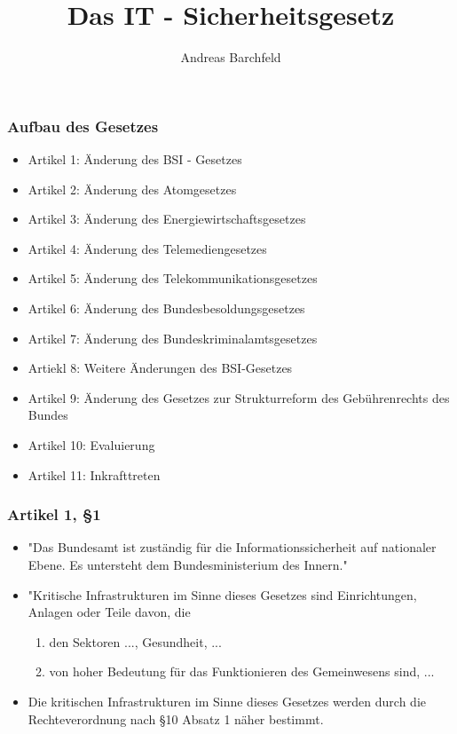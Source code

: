 \documentclass[11pt]{beamer}
\author{Andreas Barchfeld}
\title{Das IT - Sicherheitsgesetz}
\begin{document}
	\maketitle
	
	\begin{frame}
		\frametitle{Aufbau des Gesetzes}
		\begin{itemize} %
		\item Artikel 1: Änderung des BSI - Gesetzes
		\item Artikel 2: Änderung des Atomgesetzes
		\item Artikel 3: Änderung des Energiewirtschaftsgesetzes
		\item Artikel 4: Änderung des Telemediengesetzes
		\item Artikel 5: Änderung des Telekommunikationsgesetzes
		\item Artikel 6: Änderung des Bundesbesoldungsgesetzes
		\item Artikel 7: Änderung des Bundeskriminalamtsgesetzes
		\item Artiekl 8: Weitere Änderungen des BSI-Gesetzes
		\item Artikel 9: Änderung des Gesetzes zur Strukturreform des Gebührenrechts des Bundes
		\item Artikel 10: Evaluierung
		\item Artikel 11: Inkrafttreten			
		\end{itemize}
	\end{frame}
	
	\begin{frame}
		\frametitle{Artikel 1, §1}
		\begin{itemize}
			\item "Das Bundesamt ist zuständig für die Informationssicherheit auf nationaler Ebene. Es untersteht dem Bundesministerium des Innern."
			\item "Kritische Infrastrukturen im Sinne dieses Gesetzes sind Einrichtungen, Anlagen oder Teile davon, die
			\begin{enumerate}
				\item den Sektoren ..., Gesundheit, ...
				\item von hoher Bedeutung für das Funktionieren des Gemeinwesens sind, ...
			\end{enumerate}
			\item Die kritischen Infrastrukturen im Sinne dieses Gesetzes werden durch die Rechteverordnung nach §10 Absatz 1 näher bestimmt.
		\end{itemize}
	\end{frame}
	
\end{document}
